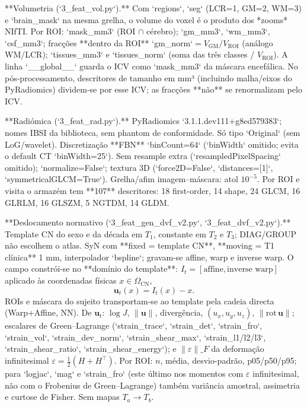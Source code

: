 \documentclass[review]{elsarticle}
\begin{document}
	**Volumetria (`3\_feat\_vol.py`).** Com `regions`, `seg` (LCR=1, GM=2, WM=3) e `brain\_mask` na mesma grelha, o volume do voxel é o produto dos *zooms* NIfTI. Por ROI: `mask\_mm3` (ROI $\cap$ cérebro); `gm\_mm3`, `wm\_mm3`, `csf\_mm3`; fracções **dentro da ROI** `gm\_norm`\(=V_{\mathrm{GM}}/V_{\mathrm{ROI}}\) (análogo WM/LCR); `tissues\_mm3` e `tissues\_norm` (soma das três classes / \(V_{\mathrm{ROI}}\)). A linha `\_\_global\_\_` guarda o ICV como `mask\_mm3` da máscara encefálica. No pós-processamento, descritores de tamanho em mm³ (incluindo malha/eixos do PyRadiomics) dividem-se por esse ICV; as fracções **não** se renormalizam pelo ICV.
	
	**Radiómica (`3\_feat\_rad.py`).** PyRadiomics `3.1.1.dev111+g8ed579383`; nomes IBSI da biblioteca, sem phantom de conformidade. Só tipo `Original` (sem LoG/wavelet). Discretização **FBN** `binCount=64` (`binWidth` omitido; evita o default CT `binWidth=25`). Sem resample extra (`resampledPixelSpacing` omitido); `normalize=False`; textura 3D (`force2D=False`, `distances=[1]`, `symmetricalGLCM=True`). Grelha/afim imagem–máscara: atol \(10^{-5}\). Por ROI e visita o armazém tem **107** descritores: 18 first-order, 14 shape, 24 GLCM, 16 GLRLM, 16 GLSZM, 5 NGTDM, 14 GLDM.
	
	**Deslocamento normativo (`3\_feat\_gen\_dvf\_v2.py`, `3\_feat\_dvf\_v2.py`).** Template CN do sexo e da década em \(T_1\), constante em \(T_2\) e \(T_3\); DIAG/GROUP não escolhem o atlas. SyN com **fixed = template CN**, **moving = T1 clínica** 1 mm, interpolador `bspline`; gravam-se affine, warp e inverse warp. O campo constrói-se no **domínio do template**: \(I_t=[\text{affine},\text{inverse warp}]\) aplicado às coordenadas físicas \(x\in\Omega_{\mathrm{CN}}\),
	\[
	\mathbf{u}_t(x)=I_t(x)-x.
	\]
	ROIs e máscara do sujeito transportam-se ao template pela cadeia directa (Warp+Affine, NN). De \(\mathbf{u}_t\): \(\log J\), \(\|\mathbf{u}\|\), divergência, \((u_x,u_y,u_z)\), \(\|\mathrm{rot}\,\mathbf{u}\|\); escalares de Green–Lagrange (`strain\_trace`, `strain\_det`, `strain\_fro`, `strain\_vol`, `strain\_dev\_norm`, `strain\_shear\_max`, `strain\_l1/l2/l3`, `strain\_shear\_ratio`, `strain\_shear\_energy`); e \(\|\varepsilon\|\_F\) da deformação infinitesimal \(\varepsilon=\tfrac12(H+H^{\top})\). Por ROI: \(n\), média, desvio-padrão, p05/p50/p95; para `logjac`, `mag` e `strain\_fro` (este último nos momentos com \(\varepsilon\) infinitesimal, não com o Frobenius de Green–Lagrange) também variância amostral, assimetria e curtose de Fisher. Sem mapas \(T_a\to T_b\).
	
\end{document}
